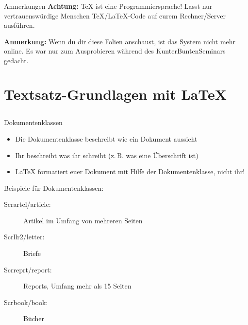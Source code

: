\documentclass{beamer}
\begin{document}
		
		\begin{frame}{Anmerkungen}
			\textbf{Achtung:} \TeX{} ist eine Programmiersprache! Lasst nur vertrauenswürdige
			Menschen \TeX/\LaTeX-Code auf eurem Rechner/Server ausführen.
			
			\vspace{0.2cm}
			\textbf{Anmerkung:} Wenn du dir diese Folien anschaust, ist das System
			nicht mehr online. Es war nur zum Ausprobieren während des
			KunterBuntenSeminars gedacht.
		\end{frame}
		
		
		\section{Textsatz-Grundlagen mit \LaTeX{}}
		\subsection*{}
		
		\begin{frame}{Dokumentenklassen}
			\begin{itemize}
				\item Die Dokumentenklasse beschreibt wie ein Dokument aussieht
				\item Ihr beschreibt was ihr schreibt (z.\,B. was eine Überschrift ist)
				\item \LaTeX{} formatiert euer Dokument mit Hilfe der Dokumentenklasse, nicht ihr!
			\end{itemize}
			\vspace{0.2cm}
			Beispiele für Dokumentenklassen:
			\begin{description}
				\item[Scrartcl/article:] Artikel im Umfang von mehreren Seiten
				\item[Scrllr2/letter:] Briefe
				\item[Scrreprt/report:] Reports, Umfang mehr als 15 Seiten
				\item[Scrbook/book:] Bücher
			\end{description}
		\end{frame}
\end{document}

